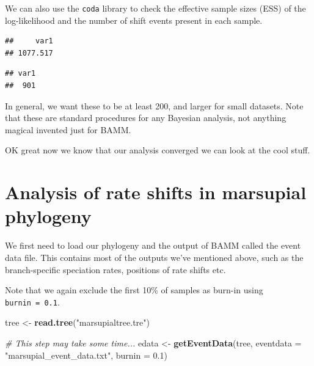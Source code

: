 \documentclass[]{book}
\newenvironment{Shaded}{\begin{snugshade}}{\end{snugshade}}
\newcommand{\KeywordTok}[1]{\textcolor[rgb]{0.13,0.29,0.53}{\textbf{{#1}}}}
\newcommand{\DataTypeTok}[1]{\textcolor[rgb]{0.13,0.29,0.53}{{#1}}}
\newcommand{\FloatTok}[1]{\textcolor[rgb]{0.00,0.00,0.81}{{#1}}}
\newcommand{\StringTok}[1]{\textcolor[rgb]{0.31,0.60,0.02}{{#1}}}
\newcommand{\CommentTok}[1]{\textcolor[rgb]{0.56,0.35,0.01}{\textit{{#1}}}}
\newcommand{\NormalTok}[1]{{#1}}
\begin{document}
We can also use the \texttt{coda} library to check the effective sample
sizes (ESS) of the log-likelihood and the number of shift events present
in each sample.

\begin{Shaded}
\end{Shaded}

\begin{verbatim}
##     var1 
## 1077.517
\end{verbatim}

\begin{Shaded}
\end{Shaded}

\begin{verbatim}
## var1 
##  901
\end{verbatim}

In general, we want these to be at least 200, and larger for small
datasets. Note that these are standard procedures for any Bayesian
analysis, not anything magical invented just for BAMM.

OK great now we know that our analysis converged we can look at the cool
stuff.

\section{Analysis of rate shifts in marsupial
phylogeny}\label{analysis-of-rate-shifts-in-marsupial-phylogeny}

We first need to load our phylogeny and the output of BAMM called the
event data file. This contains most of the outputs we've mentioned
above, such as the branch-specific speciation rates, positions of rate
shifts etc.

Note that we again exclude the first 10\% of samples as burn-in using
\texttt{burnin\ =\ 0.1}.

\begin{Shaded}
\begin{Highlighting}[]
\NormalTok{tree <-}\StringTok{ }\KeywordTok{read.tree}\NormalTok{(}\StringTok{"marsupialtree.tre"}\NormalTok{)}

\CommentTok{# This step may take some time...}
\NormalTok{edata <-}\StringTok{ }\KeywordTok{getEventData}\NormalTok{(tree, }\DataTypeTok{eventdata =} \StringTok{"marsupial_event_data.txt"}\NormalTok{, }\DataTypeTok{burnin =} \FloatTok{0.1}\NormalTok{)}
\end{Highlighting}
\end{Shaded}
\end{document}
